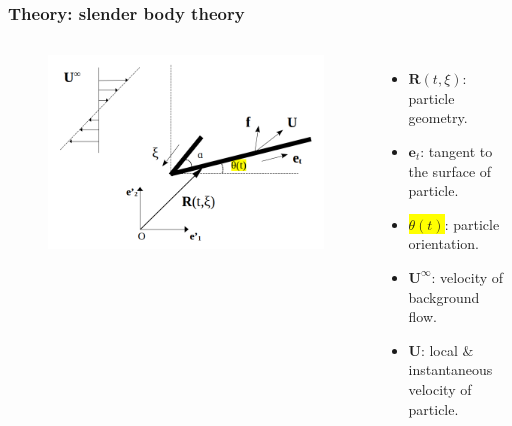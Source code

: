 \documentclass{beamer}
\newcommand{\bi}{\begin{itemize}}
\newcommand{\ei}{\end{itemize}}
\begin{document}
\begin{frame}
	\frametitle{Theory: slender body theory}
	\begin{overlayarea}{\textwidth}{\textheight}
		\vspace{-0.8cm}
		\begin{columns}
			\begin{figure}[htb]
				\begin{center}
					\includegraphics[width=1\textwidth]{plots/rigid_particle4.png}
				\end{center}
			\end{figure}
			\small \bi 
			\item $\mathbf{R}(t,\xi)$: particle geometry.
			\item $\mathbf{e}_t$: tangent to the surface of particle.
			\item \colorbox{yellow}{$\theta(t)$}: particle orientation.
			\item $\mathbf{U}^\infty$: velocity of background flow.
			\item $\mathbf{U}$: local $\&$ instantaneous velocity of particle.
			\ei
		\end{columns}\vspace{0.5cm}
	\end{overlayarea}
\end{frame}

\end{document}
